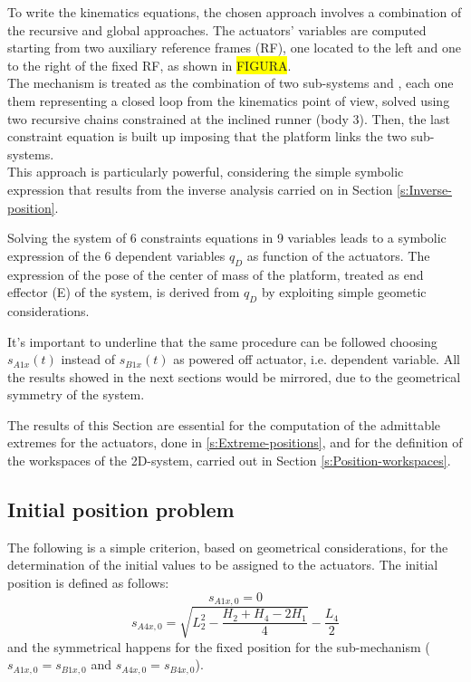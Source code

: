 \documentclass[10.5pt, twocolumn]{article}
\newcommand*\circled[1]{\tikz[baseline=(char.base)]{
	\node[shape=circle,draw,inner sep=2pt] (char) {#1};}}
\begin{document}
To write the kinematics equations, the chosen approach involves a combination of the recursive and global approaches. The actuators' variables are computed starting from two auxiliary reference frames (RF), one located to the left and one to the right of the fixed RF, as shown in \colorbox{yellow}{FIGURA}.\\
The mechanism is treated as the combination of two sub-systems \circled{A} and \circled{B}, each one them representing a closed loop from the kinematics point of view, solved using two recursive chains constrained at the inclined runner (body 3). Then, the last constraint equation is built up imposing that the platform links the two sub-systems.\\
This approach is particularly powerful, considering the simple symbolic expression that results from the inverse analysis carried on in Section \ref{s:Inverse-position}.

Solving the system of 6 constraints equations in 9 variables leads to a symbolic expression of the 6 dependent variables \( q_{D} \) as function of the actuators. The expression of the pose of the center of mass of the platform, treated as end effector (E) of the system, is derived from \( q_{D} \) by exploiting simple geometic considerations.

It's important to underline that the same procedure can be followed choosing \( s_{A1x}(t) \) instead of \( s_{B1x}(t) \) as powered off actuator, i.e. dependent variable. All the results showed in the next sections would be mirrored, due to the geometrical symmetry of the system.

The results of this Section are essential for the computation of the admittable extremes for the actuators, done in \ref{s:Extreme-positions}, and for the definition of the workspaces of the 2D-system, carried out in Section \ref{s:Position-workspaces}.

\subsection{Initial position problem}
\label{s:Initial-position}
The following is a simple criterion, based on geometrical considerations, for the determination of the initial values to be assigned to the actuators. The initial position is defined as follows:
\begin{equation}
  s_{A1x,0} = 0
\end{equation}
\begin{equation}
  s_{A4x,0} = \sqrt{L_2^2-\frac{H_2+H_4-2H_1}{4}} - \frac{L_4}{2}
\end{equation}
and the symmetrical happens for the fixed position for the sub-mechanism \circled{B} (\( s_{A1x,0} = s_{B1x,0} \) and \( s_{A4x,0} = s_{B4x,0} \)).
\end{document}
